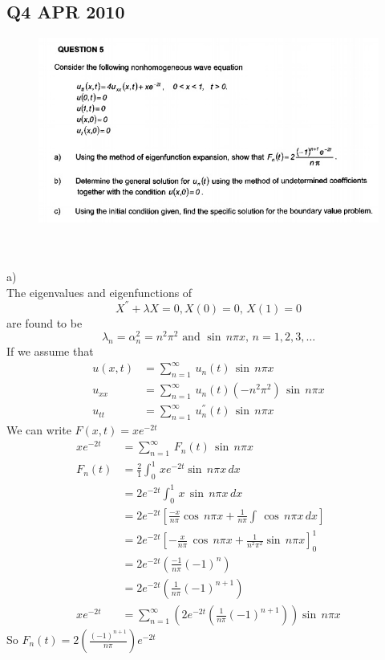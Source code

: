 \subsection{Q4 APR 2010}
\begin{figure}[!ht]
\centering
 \includegraphics[width=\textwidth]{q5ap10.jpg}    %
\end{figure}\\
\\
a)\\
The eigenvalues and eigenfunctions of 
\begin{equation}
X^{''}+\lambda X=0, X(0)=0,\,X(1)=0
\end{equation}
are found to be 
\begin{equation}
\lambda_n=\alpha_n^2=n^2\pi^2\,\,\text{and}\,\,\sin\,n\pi x,\,n=1,2,3,\ldots
\end{equation}
If we assume that
\begin{align}
u(x,t)&=\sum_{n=1}^\infty\,u_n(t)\,\sin\,n\pi x\nonumber\\
u_{xx}&=\sum_{n=1}^\infty\,u_n(t)(-n^2\pi^2)\,\sin\,n\pi x\label{q4ap10a}\\
u_{tt}&=\sum_{n=1}^\infty\,u_n^{''}(t)\,\sin\,n\pi x\label{q4ap10b}
\end{align}
We can write $F(x,t)=xe^{-2t}$
\begin{align}
xe^{-2t}&=\sum_{n=1}^\infty\,F_n(t)\,\sin\,n\pi x\nonumber\\
F_n(t)&=\frac{2}{1}\int_0^1\,xe^{-2t}\sin\,n\pi x\,dx\\
&=2e^{-2t}\int_0^1\,x\,\sin\,n\pi x\,dx\nonumber\\
&=2e^{-2t}\left[\frac{-x}{n\pi}\cos\,n\pi x+\frac{1}{n\pi}\int\,\cos\,n\pi x\,dx\right]\nonumber\\
&=2e^{-2t}\left[-\frac{x}{n\pi}\,\cos\,n\pi x+\frac{1}{n^2\pi^2}\sin\,n\pi x\right]_0^1\\
&=2e^{-2t}\left(\frac{-1}{n\pi}(-1)^n\right)\nonumber\\
&=2e^{-2t}\left(\frac{1}{n\pi}(-1)^{n+1}\right)\nonumber\\
xe^{-2t}&=\sum_{n=1}^\infty\left(2e^{-2t}\left(\frac{1}{n\pi}(-1)^{n+1}\right)\right)\sin\,n\pi x\label{q4ap10c}
\end{align}
So $F_n(t)=2\left(\frac{(-1)^{n+1}}{n\pi}\right)e^{-2t}$


